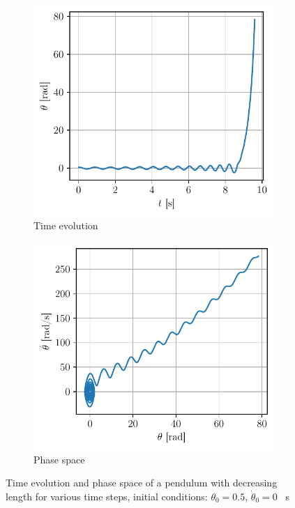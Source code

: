 \begin{figure}[h]
    \centering
    \begin{subfigure}{0.48\linewidth}
        \centering
        \includegraphics[width=\linewidth]{figures/traj_retraction.pdf}
        \caption{Time evolution}
        \label{fig:retract_time}
    \end{subfigure}
    \begin{subfigure}{0.48\linewidth}
        \centering
        \includegraphics[width=\linewidth]{figures/phase_retraction.pdf}
        \caption{Phase space}
        \label{fig:retract_phase}
    \end{subfigure}
    \caption{Time evolution and phase space of a pendulum with decreasing length for various time steps, initial conditions: $\theta_0 = 0.5$, $\dot{\theta}_0 = 0$ \si{\per\second}}
\end{figure}

